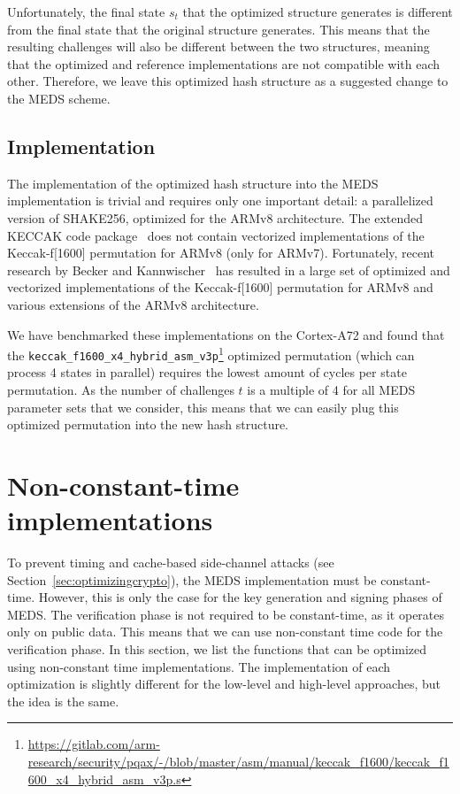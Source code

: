 \documentclass[11pt,a4paper]{report}
\theoremstyle{definition}
\begin{document}
Unfortunately, the final state $s_t$ that the optimized structure generates is different from the final state that the original structure generates. This means that the resulting challenges will also be different between the two structures, meaning that the optimized and reference implementations are not compatible with each other. Therefore, we leave this optimized hash structure as a suggested change to the MEDS scheme.

\subsection{Implementation}
The implementation of the optimized hash structure into the MEDS implementation is trivial and requires only one important detail: a parallelized version of SHAKE256, optimized for the ARMv8 architecture. The extended KECCAK code package~\cite{xkcp} does not contain vectorized implementations of the Keccak-f[1600] permutation for ARMv8 (only for ARMv7). Fortunately, recent research by Becker and Kannwischer~\cite{becker2022hybrid} has resulted in a large set of optimized and vectorized implementations of the Keccak-f[1600] permutation for ARMv8 and various extensions of the ARMv8 architecture.

We have benchmarked these implementations on the Cortex-A72 and found that the \texttt{keccak\_f1600\_x4\_hybrid\_asm\_v3p}\footnote{\url{https://gitlab.com/arm-research/security/pqax/-/blob/master/asm/manual/keccak\_f1600/keccak\_f1600\_x4\_hybrid\_asm\_v3p.s}} optimized permutation (which can process 4 states in parallel) requires the lowest amount of cycles per state permutation. As the number of challenges $t$ is a multiple of 4 for all MEDS parameter sets that we consider, this means that we can easily plug this optimized permutation into the new hash structure.

\section{Non-constant-time implementations}
\label{sec:nonconstanttime}
To prevent timing and cache-based side-channel attacks (see Section~\ref{sec:optimizingcrypto}), the MEDS implementation must be constant-time. However, this is only the case for the key generation and signing phases of MEDS. The verification phase is not required to be constant-time, as it operates only on public data. This means that we can use non-constant time code for the verification phase. In this section, we list the functions that can be optimized using non-constant time implementations. The implementation of each optimization is slightly different for the low-level and high-level approaches, but the idea is the same.
\end{document}

